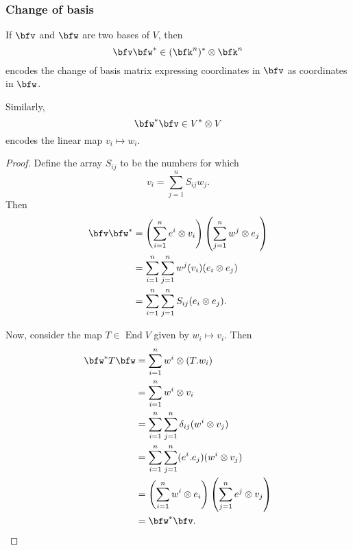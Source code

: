 \documentclass{article}
\DeclareMathOperator{\End}{End}
\newcommand*\acts{.}
\begin{document}
\subsubsection{Change of basis}

\begin{proposition}
    If $\bfv$ and $\bfw$ are two bases of $V$, then
    \[
        \bfv\bfw^\ast \in (\bfk^n)^\ast \otimes \bfk^n
    \]
    encodes the change of basis matrix expressing coordinates in $\bfv$ as coordinates in $\bfw$.

    Similarly,
    \[
        \bfw^\ast\bfv \in V^\ast \otimes V
    \]
    encodes the linear map $v_i \mapsto w_i$.
\end{proposition}
\begin{proof}
    Define the array $S_{ij}$ to be the numbers for which
    \[
        v_i
        =
        \sum_{j=1}^n
        S_{ij}w_j.
    \]
    Then
    \begin{align*}
       \bfv \bfw^\ast
       &=
       \left(
           \sum_{i=1}^n
           e^i \otimes v_i
       \right)
       \left(
           \sum_{j=1}^n
           w^j \otimes e_j
       \right)
       \\
       &=
       \sum_{i=1}^n
       \sum_{j=1}^n
       w^j(v_i)
       (e_i \otimes e_j)
       \\
       &=
       \sum_{i=1}^n
       \sum_{j=1}^n
       S_{ij}
       (e_i \otimes e_j).
    \end{align*}

    Now, consider the map $T \in \End V$ given by $w_i \mapsto v_i$.
    Then
    \begin{align*}
        \bfw^\ast T \bfw
        &=
        \sum_{i=1}^n
        w^i \otimes (T \acts w_i)
        \\
        &=
        \sum_{i=1}^n
        w^i \otimes v_i
        \\
        &=
        \sum_{i=1}^n
        \sum_{j=1}^n
        \delta_{ij}
        (w^i \otimes v_j)
        \\
        &=
        \sum_{i=1}^n
        \sum_{j=1}^n
        (e^i \acts e_j)
        (w^i \otimes v_j)
        \\
        &=
        \left(
            \sum_{i=1}^n
            w^i \otimes e_i
        \right)
        \left(
            \sum_{j=1}^n
            e^j \otimes v_j
        \right)
        \\
        &=
        \bfw^\ast\bfv.
    \end{align*}
\end{proof}
\end{document}
